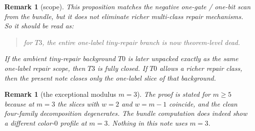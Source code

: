 \documentclass[11pt]{article}
\newtheorem{remark}[theorem]{Remark}
\begin{document}
\begin{remark}[scope]
This proposition matches the negative one-gate / one-bit scan from the bundle, but
it does \emph{not} eliminate richer multi-class repair mechanisms.
So it should be read as:
\begin{quote}
for $T3$, the entire one-label tiny-repair branch is now theorem-level dead.
\end{quote}
If the ambient tiny-repair background $T0$ is later unpacked exactly as the same
one-label repair scope, then $T3$ is fully closed.
If $T0$ allows a richer repair class, then the present note closes only the one-label
slice of that background.
\end{remark}

\begin{remark}[the exceptional modulus $m=3$]
The proof is stated for $m\ge 5$ because at $m=3$ the slices with $w=2$ and
$w=m-1$ coincide, and the clean four-family decomposition degenerates.
The bundle computation does indeed show a different color-$0$ profile at $m=3$.
Nothing in this note uses $m=3$.
\end{remark}
\end{document}
